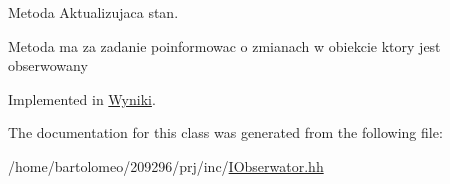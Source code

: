 Metoda Aktualizujaca stan. 

Metoda ma za zadanie poinformowac o zmianach w obiekcie ktory jest obserwowany 

Implemented in \hyperlink{class_wyniki_a4014236438f62cfd90c03de49ea38e5f}{Wyniki}.



The documentation for this class was generated from the following file\-:\begin{DoxyCompactItemize}
\item 
/home/bartolomeo/209296/prj/inc/\hyperlink{_i_obserwator_8hh}{I\-Obserwator.\-hh}\end{DoxyCompactItemize}
